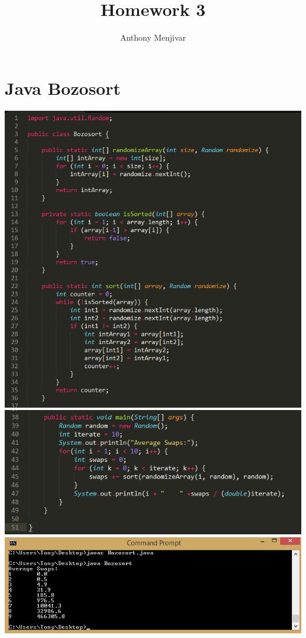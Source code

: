 \documentclass{article}
\title{Homework 3}
\author{Anthony Menjivar}
\date{}
\begin{document}
\maketitle
\section{Java Bozosort}
\begin{center}
\includegraphics{Bozosort1.png}
\includegraphics{Bozosort2.png}
\includegraphics{BozosortTable.png}
\end{center}
\vspace{100mm}
\end{document}
